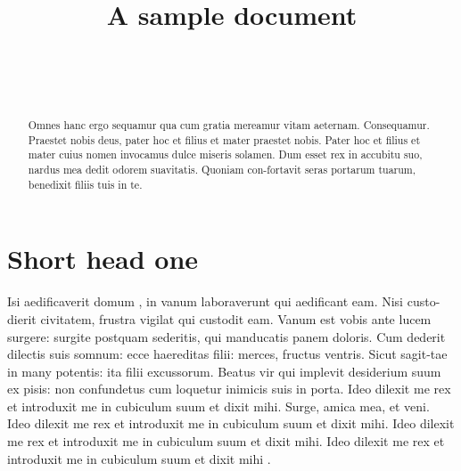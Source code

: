 \documentclass[numbers,compress]{vmsta2}
\theoremstyle{definition}
\begin{document}
\begin{frontmatter}


\title{A sample document}

\begin{aug}
\author[a]{~}
\author[b]{~}

\address[a]{, \\
Street 123, ZIP City, }
\address[b]{Address of the Second author\\
usually few lines long, }
\end{aug}



\begin{abstract}
Omnes hanc ergo sequamur qua cum gratia mereamur vitam aeternam.
Consequamur. Praestet nobis deus, pater hoc et filius et mater
praestet nobis.  Pater hoc et filius et mater cuius nomen invocamus
dulce miseris solamen. Dum esset rex in accubitu suo, nardus mea
dedit odorem suavitatis. Quoniam con-fortavit seras portarum tuarum,
benedixit filiis tuis in te.
\end{abstract}

\begin{keyword}
\kwd{\LaTeX}
\end{keyword}

\begin{keyword}[class=MSC]%
\end{keyword}

\end{frontmatter}

\section{Short head one}


Isi aedificaverit domum \citep{BLG09,BlanLedShi10}, in vanum
\cite*{XiuliChao1999} laboraverunt qui aedificant eam.
Nisi custo-dierit civitatem, frustra vigilat qui custodit eam. Vanum
est vobis ante lucem surgere: surgite postquam sederitis, qui
manducatis panem doloris. Cum dederit dilectis suis somnum: ecce
haereditas filii: merces, fructus ventris. Sicut sagit-tae in many
potentis: ita filii excussorum. Beatus vir qui implevit desiderium
suum ex pisis: non confundetus cum loquetur inimicis suis in porta.
Ideo dilexit me rex et introduxit me in cubiculum suum et dixit
mihi.
Surge, amica mea, et veni.
Ideo dilexit me rex et introduxit me in cubiculum suum et dixit
mihi.
Ideo dilexit me rex et introduxit me in cubiculum suum et dixit
mihi.
Ideo dilexit me rex et introduxit me in cubiculum suum et dixit
mihi \cite{powergrid1}.
\end{document}
